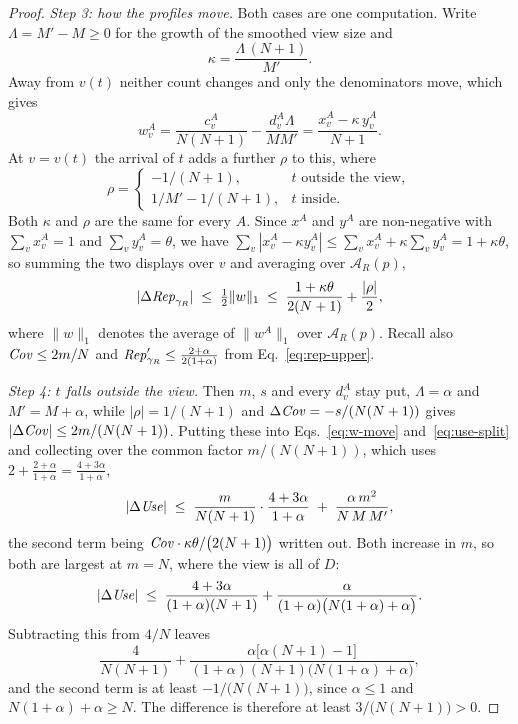 \begin{proof}
{\emph{Step 3: how the profiles move.}
Both cases are one computation.
Write $\Lambda=M'-M\ge0$ for the growth of the smoothed view size and
\[
\kappa=\frac{\Lambda\,(N+1)}{M'} .
\]
Away from $v(t)$ neither count changes and only the denominators move, which gives
\[
w^A_v=\frac{c^A_v}{N(N+1)}-\frac{d^A_v\Lambda}{MM'}=\frac{x^A_v-\kappa\,y^A_v}{N+1} .
\]
At $v=v(t)$ the arrival of $t$ adds a further $\rho$ to this, where
\[
\rho=\begin{cases}-1/(N+1), & t\text{ outside the view},\\[2pt]
1/M'-1/(N+1), & t\text{ inside}.\end{cases}
\]
Both $\kappa$ and $\rho$ are the same for every $A$.
Since $x^A$ and $y^A$ are non-negative with $\sum_v x^A_v=1$ and $\sum_v y^A_v=\theta$, we have
$\sum_v|x^A_v-\kappa y^A_v|\le\sum_v x^A_v+\kappa\sum_v y^A_v=1+\kappa\theta$, so summing the two
displays over $v$ and averaging over $\mathcal{A}_R(p)$,
\begin{equation}
|\Delta\mathit{Rep}_{\gamma_R}|\;\le\;\tfrac12\|w\|_1\;\le\;\frac{1+\kappa\theta}{2(N+1)}+\frac{|\rho|}{2} ,
\label{eq:w-move}
\end{equation}
where $\|w\|_1$ denotes the average of $\|w^A\|_1$ over $\mathcal{A}_R(p)$.
Recall also $\mathit{Cov}\le2m/N$ and $\mathit{Rep}'_{\gamma_R}\le\frac{2+\alpha}{2(1+\alpha)}$ from
Eq.~\eqref{eq:rep-upper}.

\emph{Step 4: $t$ falls outside the view.}
Then $m$, $s$ and every $d^A_v$ stay put, $\Lambda=\alpha$ and $M'=M+\alpha$, while
$|\rho|=1/(N+1)$ and $\Delta\mathit{Cov}=-s/(N(N+1))$ gives $|\Delta\mathit{Cov}|\le2m/(N(N+1))$.
Putting these into Eqs.~\eqref{eq:w-move} and~\eqref{eq:use-split} and collecting over the common
factor $m/(N(N+1))$, which uses $2+\tfrac{2+\alpha}{1+\alpha}=\tfrac{4+3\alpha}{1+\alpha}$,
\[
|\Delta\mathit{Use}|\;\le\;\frac{m}{N(N+1)}\cdot\frac{4+3\alpha}{1+\alpha}\;+\;\frac{\alpha\,m^2}{N\,M\,M'},
\]
the second term being $\mathit{Cov}\cdot\kappa\theta/\big(2(N+1)\big)$ written out.
Both increase in $m$, so both are largest at $m=N$, where the view is all of $D$:
\[
|\Delta\mathit{Use}|\;\le\;\frac{4+3\alpha}{(1+\alpha)(N+1)}
+\frac{\alpha}{(1+\alpha)\big(N(1+\alpha)+\alpha\big)} .
\]
Subtracting this from $4/N$ leaves
\[
\frac{4}{N(N+1)}+\frac{\alpha\big[\alpha(N+1)-1\big]}
{(1+\alpha)(N+1)\big(N(1+\alpha)+\alpha\big)} ,
\]
and the second term is at least $-1/\big(N(N+1)\big)$, since $\alpha\le1$ and
$N(1+\alpha)+\alpha\ge N$. The difference is therefore at least $3/\big(N(N+1)\big)>0$.

}
\end{proof}
